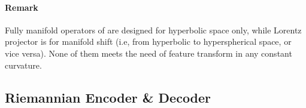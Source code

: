 \paragraph{Remark} 
Fully manifold operators of \citet{acl22chen,BdeirSL24} are designed for hyperbolic space only,
while Lorentz projector  \cite{aaai23sunli} is  for manifold shift (i.e, from hyperbolic to hyperspherical space, or vice versa).
None of them meets the need of feature transform in any constant curvature.


\subsection{Riemannian Encoder \& Decoder} 


